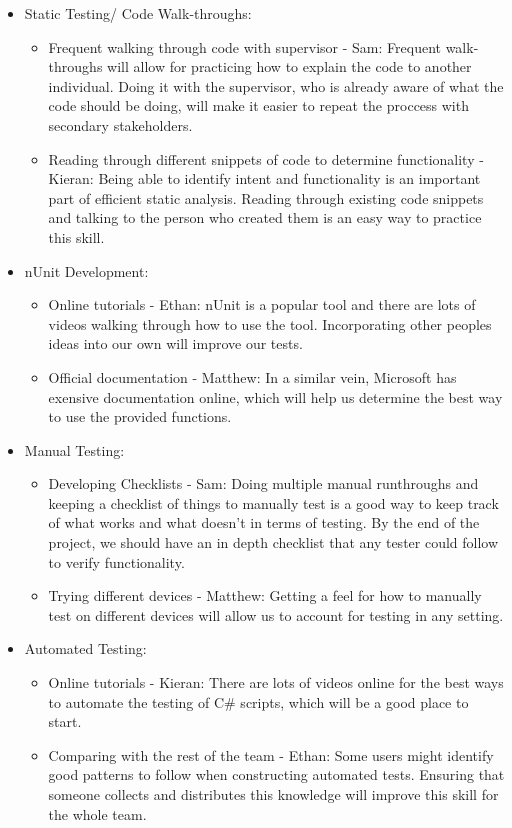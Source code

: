 \documentclass[12pt, titlepage]{article}
\begin{document}
\begin{enumerate}
  \begin{itemize}
      \item Static Testing/ Code Walk-throughs:
      \begin{itemize}
          \item Frequent walking through code with supervisor - Sam: Frequent walk-throughs will allow for practicing how to explain the code to another individual. Doing it with the supervisor, who is already aware of what the code should be doing, will make it easier to repeat the proccess with secondary stakeholders.
          \item Reading through different snippets of code to determine functionality - Kieran: Being able to identify intent and functionality is an important part of efficient static analysis. Reading through existing code snippets and talking to the person who created them is an easy way to practice this skill.
      \end{itemize}
      \item nUnit Development:
      \begin{itemize}
          \item Online tutorials - Ethan: nUnit is a popular tool and there are lots of videos walking through how to use the tool. Incorporating other peoples ideas into our own will improve our tests. 
          \item Official documentation - Matthew: In a similar vein, Microsoft has exensive documentation online, which will help us determine the best way to use the provided functions.
      \end{itemize}
      \item Manual Testing:
      \begin{itemize}
          \item Developing Checklists - Sam: Doing multiple manual runthroughs and keeping a checklist of things to manually test is a good way to keep track of what works and what doesn't in terms of testing. By the end of the project, we should have an in depth checklist that any tester could follow to verify functionality. 
          \item Trying different devices - Matthew: Getting a feel for how to manually test on different devices will allow us to account for testing in any setting. 
      \end{itemize}
      \item Automated Testing:
      \begin{itemize}
          \item Online tutorials - Kieran: There are lots of videos online for the best ways to automate the testing of C\# scripts, which will be a good place to start. 
          \item Comparing with the rest of the team - Ethan: Some users might identify good patterns to follow when constructing automated tests. Ensuring that someone collects and distributes this knowledge will improve this skill for the whole team.
      \end{itemize}
  \end{itemize}
\end{enumerate}
\end{document}
